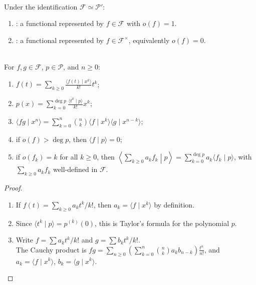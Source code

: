 \begin{definition} \label{def:delta-and-invertible-functionals} \\
Under the identification $\mathscr{F}\simeq\mathscr{P}'$:
\begin{enumerate}[label=(\roman*)]
\setlength{\itemsep}{0pt}
\item {}: a functional represented by $f\in\mathscr{F}$ with $o(f)=1$.
\item {}: a functional represented by $f\in\mathscr{F}^{\times}$, equivalently $o(f)=0$.
\end{enumerate}
\end{definition}

\begin{proposition} \label{prop:umbral-algebra-basic-identities} \\
For $f,g\in\mathscr{F}$, $p\in\mathscr{P}$, and $n\geq0$:
\begin{enumerate}[label=(\roman*)]
\setlength{\itemsep}{0pt}
\item $\displaystyle f(t)=\sum_{k\geq0}\frac{\langle f(t)\mid x^k\rangle}{k!}t^k$;
\item $\displaystyle p(x)=\sum_{k=0}^{\deg p}\frac{\langle t^k\mid p\rangle}{k!}x^k$;
\item $\displaystyle \langle fg\mid x^n\rangle =\sum\limits_{k=0}^{n}\binom{n}{k} \langle f\mid x^k\rangle \langle g\mid x^{n-k}\rangle$;
\item if $o(f)>\deg p$, then $\langle f\mid p\rangle=0$;
\item if $o(f_k)=k$ for all $k\geq0$, then $\left\langle\sum\limits_{k\geq0}a_kf_k\middle|p\right\rangle =\sum\limits_{k=0}^{\deg p}a_k\langle f_k\mid p\rangle$, with $\sum\limits_{k\geq0}a_kf_k$ well-defined in $\mathscr{F}$.
\end{enumerate}
\begin{proof}
\begin{enumerate}[label=(\roman*)]
\setlength{\itemsep}{0pt}
\item If $f(t)=\sum\limits_{k\geq0}a_kt^k/k!$, then $a_k=\langle f\mid x^k\rangle$ by definition.
\item Since $\langle t^k\mid p\rangle=p^{(k)}(0)$, this is Taylor's formula
for the polynomial $p$.
\item Write $f=\sum a_kt^k/k!$ and $g=\sum b_kt^k/k!$.\\
The Cauchy product is $fg=\sum\limits_{n\geq0} \left(\sum\limits_{k=0}^{n}\binom{n}{k}a_kb_{n-k}\right)\frac{t^n}{n!}$, and $a_k=\langle f\mid x^k\rangle$, $b_k=\langle g\mid x^k\rangle$.

\end{enumerate}
\end{proof}
\end{proposition}
